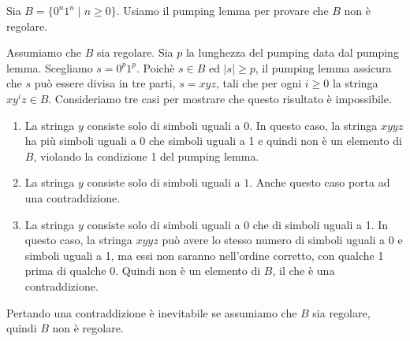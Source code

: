 \documentclass[12pt]{report}
\newcounter{lemma}
\begin{document}
	\begin{example}{}{}
	Sia $B = \{0^n1^n \mid n \geq 0\}$. Usiamo il pumping lemma per provare che $B$ non è regolare.

	Assumiamo che $B$ sia regolare. Sia $p$ la lunghezza del pumping data dal pumping lemma. Scegliamo $s = 0^p1^p$. Poichè $s \in B$ ed $|s| \geq p$, il pumping lemma assicura che $s$ può essere divisa in tre parti, $s = xyz$, tali che per ogni $i \geq 0$ la stringa $xy^iz \in B$. Consideriamo tre casi per mostrare che questo risultato è impossibile.
		\begin{enumerate}
			\item La stringa $y$ consiste solo di simboli uguali a 0. In questo caso, la stringa $xyyz$ ha più simboli uguali a 0 che simboli uguali a 1 e quindi non è un elemento di $B$, violando la condizione 1 del pumping lemma.
			\item La stringa $y$ consiste solo di simboli uguali a $1$. Anche questo caso porta ad una contraddizione.
			\item La stringa $y$ consiste solo di simboli uguali a 0 che di simboli uguali a 1. In questo caso, la stringa $xyyz$ può avere lo stesso numero di simboli uguali a 0 e simboli uguali a 1, ma essi non saranno nell'ordine corretto, con qualche 1 prima di qualche 0. Quindi non è un elemento di $B$, il che è una contraddizione.
		\end{enumerate}
	\end{example}

	Pertando una contraddizione è inevitabile se assumiamo che $B$ sia regolare, quindi $B$ non è regolare.
\end{document}
